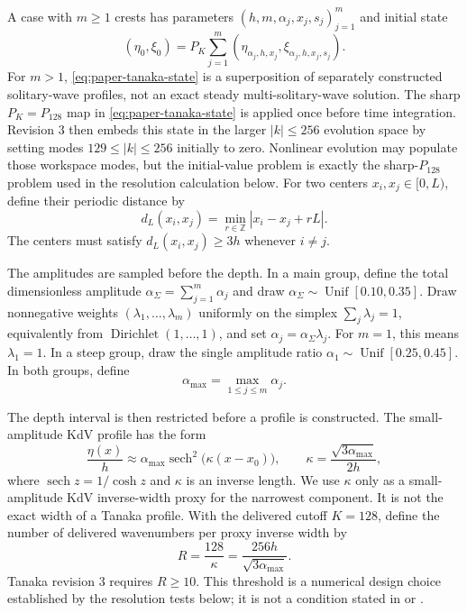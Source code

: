 A case with $m\geq1$ crests has parameters
$(h,m,\alpha_j,x_j,s_j)_{j=1}^m$ and initial state
\begin{equation}
  (\eta_0,\xi_0)
  =
  P_K\sum_{j=1}^{m}
  \left(
    \eta_{\alpha_j,h,x_j},
    \xi_{\alpha_j,h,x_j,s_j}
  \right).
  \label{eq:paper-tanaka-state}
\end{equation}
For $m>1$, \cref{eq:paper-tanaka-state} is a superposition of separately
constructed solitary-wave profiles, not an exact steady multi-solitary-wave
solution.
The sharp $P_K=P_{128}$ map in \cref{eq:paper-tanaka-state} is applied once
before time integration.  Revision 3 then embeds this state in the larger
$|k|\leq256$ evolution space by setting modes $129\leq|k|\leq256$ initially
to zero.  Nonlinear evolution may populate those workspace modes, but the
initial-value problem is exactly the sharp-$P_{128}$ problem used in the
resolution calculation below.
For two centers $x_i,x_j\in[0,L)$, define their periodic distance by
\begin{equation}
  d_L(x_i,x_j)
  =
  \min_{r\in\mathbb Z}|x_i-x_j+rL|.
  \label{eq:paper-periodic-distance}
\end{equation}
The centers must satisfy $d_L(x_i,x_j)\geq3h$ whenever $i\ne j$.

The amplitudes are sampled before the depth.  In a main group, define the
total dimensionless amplitude
$\alpha_\Sigma=\sum_{j=1}^m\alpha_j$ and draw
$\alpha_\Sigma\sim\operatorname{Unif}[0.10,0.35]$.  Draw nonnegative weights
$(\lambda_1,\ldots,\lambda_m)$ uniformly on the simplex
$\sum_j\lambda_j=1$, equivalently from
$\operatorname{Dirichlet}(1,\ldots,1)$, and set
$\alpha_j=\alpha_\Sigma\lambda_j$.  For $m=1$, this means
$\lambda_1=1$.  In a steep group, draw the single amplitude ratio
$\alpha_1\sim\operatorname{Unif}[0.25,0.45]$.  In both groups, define
\begin{equation}
  \alpha_{\max}=\max_{1\leq j\leq m}\alpha_j.
  \label{eq:paper-tanaka-maximum-amplitude}
\end{equation}

The depth interval is then restricted before a profile is constructed.  The
small-amplitude KdV profile has the form
\begin{equation}
  \frac{\eta(x)}{h}
  \approx
  \alpha_{\max}\operatorname{sech}^2\!\bigl(\kappa(x-x_0)\bigr),
  \qquad
  \kappa=\frac{\sqrt{3\alpha_{\max}}}{2h},
  \label{eq:paper-tanaka-kdv-width}
\end{equation}
where $\operatorname{sech}z=1/\cosh z$ and $\kappa$ is an inverse length.
We use $\kappa$ only as a small-amplitude KdV inverse-width proxy for the
narrowest component.  It is not the exact width of a Tanaka profile.  With
the delivered cutoff $K=128$, define the number of delivered wavenumbers per
proxy inverse width by
\begin{equation}
  R=\frac{128}{\kappa}
   =\frac{256h}{\sqrt{3\alpha_{\max}}}.
  \label{eq:paper-tanaka-resolution-ratio}
\end{equation}
Tanaka revision 3 requires $R\geq10$.  This threshold is a numerical design
choice established by the resolution tests below; it is not a condition
stated in \cite{tanaka1986} or \cite{xu2009}.

